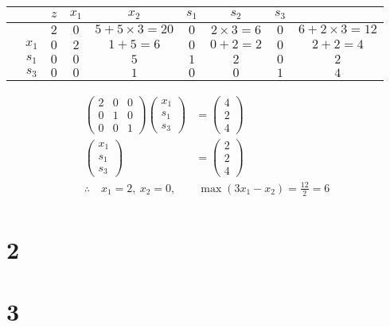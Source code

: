\documentclass[a4paper,12pt]{article}
\begin{document}
\begin{table}[H]
    \footnotesize
    \begin{tabular}{cc|cccccc|c}
         &       & $z$ & $x_1$ & $x_2$                 & $s_1$ & $s_2$            & $s_3$ &                       \\
        \hline
         &       & $2$ & $0$   & $5 + 5 \times 3 = 20$ & $0$   & $2 \times 3 = 6$ & $0$   & $6 + 2 \times 3 = 12$ \\
        \hline
         & $x_1$ & $0$ & $2$   & $1 + 5 = 6$           & $0$   & $0 + 2 = 2$      & $0$   & $2 + 2 = 4$           \\
         & $s_1$ & $0$ & $0$   & $5$                   & $1$   & $2$              & $0$   & $2$                   \\
         & $s_3$ & $0$ & $0$   & $1$                   & $0$   & $0$              & $1$   & $4$                   \\
    \end{tabular}
\end{table}

\begin{align*}
    \begin{pmatrix}2 & 0 & 0 \\ 0 & 1 & 0 \\ 0 & 0 & 1\end{pmatrix} \begin{pmatrix}x_1 \\ s_1 \\ s_3\end{pmatrix} & = \begin{pmatrix}4 \\ 2 \\ 4\end{pmatrix} \\
    \begin{pmatrix}x_1 \\s_1 \\ s_3\end{pmatrix}                                                                  & = \begin{pmatrix}2 \\ 2 \\ 4\end{pmatrix} \\
    \therefore \quad x_1 = 2, \ x_2 = 0,                                                                          & \ \max{(3 x_1 - x_2)} = \frac{12}{2} = 6  \\
\end{align*}


\section*{2}

\section*{3}
\end{document}
